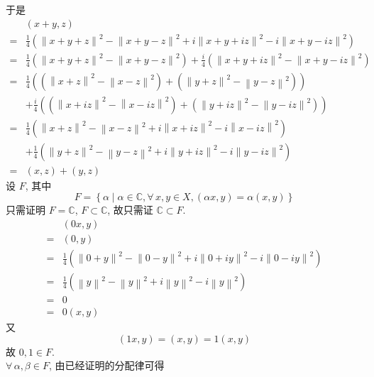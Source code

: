 \documentclass[../main.tex]{subfiles}
\begin{document}
于是
\begin{align*}
    & \left( x + y, z \right) \\
    =& \frac{1}{4} \left( \left\| x + y + z \right\|^2 - \left\| x + y - z \right\|^2 + i \left\| x + y + i z \right\|^2 - i \left\| x + y - i z \right\|^2 \right) \\
    =& \frac{1}{4} \left( \left\| x + y + z \right\|^2 - \left\| x + y - z \right\|^2 \right) + \frac{i}{4} \left( \left\| x + y + i z \right\|^2 - \left\| x + y - i z \right\|^2 \right) \\
    =& \frac{1}{4} \left( \left( \left\| x + z \right\|^2 - \left\| x - z \right\|^2 \right) + \left( \left\| y + z \right\|^2 - \left\| y - z \right\|^2 \right) \right) \\
    & + \frac{i}{4} \left( \left( \left\| x + i z \right\|^2 - \left\| x - i z \right\|^2 \right) + \left( \left\| y + i z \right\|^2 - \left\| y - i z \right\|^2 \right) \right) \\
    =& \frac{1}{4} \left( \left\| x + z \right\|^2 - \left\| x - z \right\|^2 + i \left\| x + i z \right\|^2 - i \left\| x - i z \right\|^2 \right) \\
    & + \frac{1}{4} \left( \left\| y + z \right\|^2 - \left\| y - z \right\|^2 + i \left\| y + i z \right\|^2 - i \left\| y - i z \right\|^2 \right) \\
    =& \left( x, z \right) + \left( y, z \right)
\end{align*}
设 $F$, 其中
\[
    F = \left\{ \alpha \mid \alpha \in \mathbb{C}, \forall \, x, y \in X, \left( \alpha x, y \right) = \alpha \left( x, y \right) \right\}
\]
只需证明 $F = \mathbb{C}$, $F \subset \mathbb{C}$, 故只需证 $\mathbb{C} \subset F$.
\begin{align*}
     & \left( 0 x, y \right) \\
    =& \left( 0, y \right) \\
    =& \frac{1}{4} \left( \left\| 0 + y \right\|^2 - \left\| 0 - y \right\|^2 + i \left\| 0 + i y \right\|^2 - i \left\| 0 - i y \right\|^2 \right) \\
    =& \frac{1}{4} \left( \left\| y \right\|^2 - \left\| y \right\|^2 + i \left\| y \right\|^2 - i \left\| y \right\|^2 \right) \\
    =& 0 \\
    =& 0 \left( x, y \right)
\end{align*}
又
\[
    \left( 1 x, y \right)
    = \left( x , y \right)
    = 1 \left( x, y \right)
\]
故 $0, 1 \in F$. \\
$\forall \, \alpha, \beta \in F$, 由已经证明的分配律可得
\end{document}
